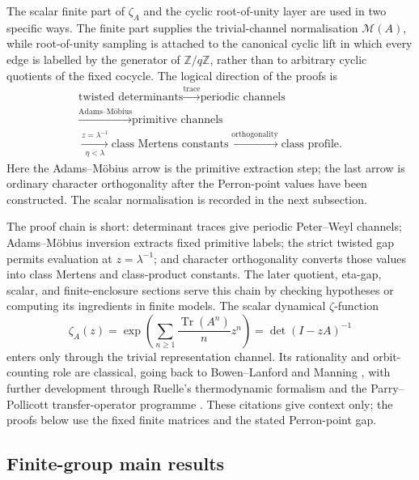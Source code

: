 \documentclass[11pt,a4paper]{amsart}
\theoremstyle{plain}
\theoremstyle{definition}
\theoremstyle{remark}
\DeclareMathOperator{\Tr}{Tr}
\newcommand{\ZZ}{\mathbb{Z}}
\begin{document}
The scalar finite part of \(\zeta_A\) and the cyclic root-of-unity layer are
used in two specific ways.  The finite part supplies the trivial-channel
normalisation \(\mathcal M(A)\), while root-of-unity sampling is attached to
the canonical cyclic lift in which every edge is labelled by the generator of
\(\ZZ/q\ZZ\), rather than to arbitrary cyclic quotients of the fixed cocycle.
The logical direction of the proofs is
\[
  \begin{array}{c}
    \text{twisted determinants}
    \xrightarrow{\text{trace}}
    \text{periodic channels} \\[2pt]
    \xrightarrow{\text{Adams--M\"obius}}
    \text{primitive channels} \\[2pt]
    \xrightarrow[\eta<\lambda]{z=\lambda^{-1}}
    \text{class Mertens constants}
    \xrightarrow{\text{orthogonality}}
    \text{class profile}.
  \end{array}
\]
Here the Adams--M\"obius arrow is the primitive extraction step; the last
arrow is ordinary character orthogonality after the Perron-point values
have been constructed. The scalar normalisation is recorded in the next subsection.

The proof chain is short: determinant traces give periodic Peter--Weyl
channels; Adams--M\"obius inversion extracts fixed primitive labels; the strict
twisted gap permits evaluation at \(z=\lambda^{-1}\); and character
orthogonality converts those values into class Mertens and class-product
constants.  The later quotient, eta-gap, scalar, and finite-enclosure sections
serve this chain by checking hypotheses or computing its ingredients in finite
models.  The scalar dynamical \(\zeta\)-function
\[
  \zeta_A(z)
  =\exp\!\left(\sum_{n\ge 1}\frac{\Tr(A^n)}{n}z^n\right)
  =\det(I-zA)^{-1}
\]
enters only through the trivial representation channel. Its rationality
and orbit-counting role are classical, going back to
Bowen--Lanford \cite{BowenLanford1970Zeta} and Manning
\cite{Manning1971Axiom}, with further development through Ruelle's
thermodynamic formalism
\cite{Ruelle1976ZetaExpanding,Ruelle1978Thermodynamic} and the
Parry--Pollicott transfer-operator programme
\cite{ParryPollicott1990Zeta}. These citations give context only; the proofs
below use the fixed finite matrices and the stated Perron-point gap.

\subsection{Finite-group main results}
\end{document}

